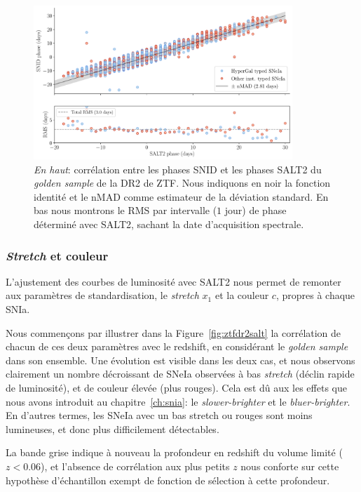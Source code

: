 \documentclass[../main/main.tex]{subfiles}
\begin{document}
\begin{figure}[ht]
  \centering
  \includegraphics[width=0.87\textwidth]{../figures/09_dr2/snidphase_vsphase_dr2.pdf}
  \caption[Corrélation phases SNID vs phases SALT2 de la DR2 de
  ZTF.]{\emph{En haut}: corrélation entre les phases SNID et les phases SALT2 du
    \textit{golden sample} de la DR2 de ZTF. Nous indiquons en noir la fonction identité
    et le nMAD comme estimateur de la déviation standard. En bas nous
    montrons le RMS par intervalle ($1$ jour) de phase déterminé avec
    SALT2, sachant la date d'acquisition spectrale.}
  \label{fig:snid_vs_salt_phase}
\end{figure}


\subsubsection{\textit{Stretch} et couleur}

L'ajustement des courbes de luminosité avec SALT2 nous permet de
remonter aux paramètres de standardisation, le \textit{stretch} $x_{1}$
et la couleur $c$, propres à chaque SNIa.

Nous commençons par illustrer dans la Figure~\ref{fig:ztfdr2salt} la
corrélation de chacun de ces deux paramètres avec le redshift, en
considérant le \textit{golden sample} dans son ensemble. Une évolution
est visible dans les deux cas, et nous observons
clairement un nombre décroissant de SNeIa observées à bas
\textit{stretch} (déclin rapide de luminosité), et de couleur élevée
(plus rouges). Cela est dû aux les effets que nous avons introduit au
chapitre~\ref{ch:snia}: le
\textit{slower-brighter} et le \textit{bluer-brighter}. En d'autres
termes, les SNeIa avec un bas stretch ou rouges sont moins lumineuses,
et donc plus difficilement détectables.

La bande grise indique à nouveau la profondeur en
redshift du volume limité ($z<0.06$), et l'absence de corrélation aux
plus petits $z$ nous conforte sur cette hypothèse d'échantillon exempt de
fonction de sélection à cette profondeur.
\end{document}

